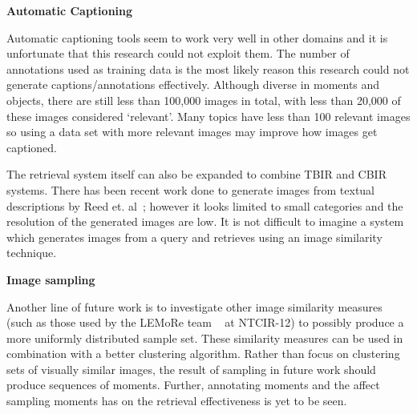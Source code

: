 \textbf{Automatic Captioning}

Automatic captioning tools seem to work very well in other domains and it is unfortunate that this research could not exploit them. The number of annotations used as training data is the most likely reason this research could not generate captions/annotations effectively. Although diverse in moments and objects, there are still less than 100,000 images in total, with less than 20,000 of these images considered `relevant'. Many topics have less than 100 relevant images so using a data set with more relevant images may improve how images get captioned. 

The retrieval system itself can also be expanded to combine TBIR and CBIR systems. There has been recent work done to generate images from textual descriptions by Reed et. al~\cite{reed2016generative}; however it looks limited to small categories and the resolution of the generated images are low. It is not difficult to imagine a system which generates images from a query and retrieves using an image similarity technique.

\textbf{Image sampling}

Another line of future work is to investigate other image similarity measures (such as those used by the LEMoRe team ~\cite{de40lemore} at NTCIR-12) to possibly produce a more uniformly distributed sample set. These similarity measures can be used in combination with a better clustering algorithm. Rather than focus on clustering sets of visually similar images, the result of sampling in future work should produce sequences of moments. Further, annotating moments and the affect sampling moments has on the retrieval effectiveness is yet to be seen.

 
 

